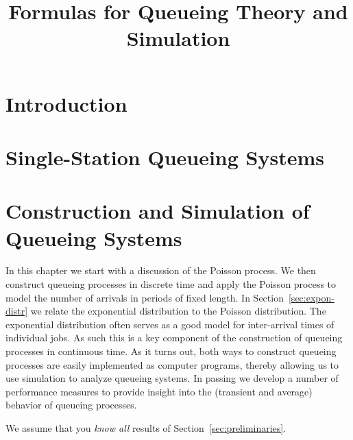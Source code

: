 \documentclass{book}
\title{Formulas for Queueing Theory and Simulation}
\begin{document}
\frontmatter
\maketitle

\tableofcontents


\chapter{Introduction}\label{sec:introduction}

%
%
%

\mainmatter
\chapter{Single-Station Queueing Systems}

\chapter{Construction and Simulation of Queueing Systems}
\label{cha:single-stat-queu}

In this chapter we start with a discussion of the Poisson process.
We then construct queueing processes in discrete time and apply the Poisson process to model the number of arrivals in periods of fixed length.
In Section~\ref{sec:expon-distr} we relate the exponential distribution to the Poisson distribution.
The exponential distribution often serves as a good model for inter-arrival times of individual jobs.
As such this is a key component of the construction of queueing processes in continuous time.
As it turns out, both ways to construct queueing processes are easily implemented as computer programs, thereby allowing us to use simulation to analyze queueing systems.
In passing we develop a number of performance measures to provide insight into the (transient and average) behavior of queueing processes.

We assume that you  \emph{know all} results of Section~\ref{sec:preliminaries}. 


\end{document}
